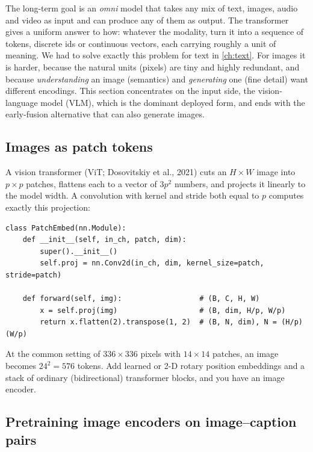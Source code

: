 The long-term goal is an \emph{omni} model that takes any mix of text, images, audio and
video as input and can produce any of them as output. The transformer gives a uniform answer
to how: whatever the modality, turn it into a sequence of tokens, discrete ids or continuous
vectors, each carrying roughly a unit of meaning. We had to solve exactly this problem for text in
\cref{ch:text}. For images it is harder, because the natural units (pixels) are tiny and
highly redundant, and because \emph{understanding} an image (semantics) and \emph{generating}
one (fine detail) want different encodings. This section concentrates on the input side, the
vision-language model (VLM), which is the dominant deployed form, and ends with the early-fusion
alternative that can also generate images.

\subsection{Images as patch tokens}

A vision transformer (ViT; Dosovitskiy et al., 2021) cuts an $H\times W$ image into $p\times p$
patches, flattens each to a vector of $3p^2$ numbers, and projects it linearly to the model width.
A convolution with kernel and stride both equal to $p$ computes exactly this projection:
\begin{lstlisting}[caption={Patch embedding: a strided convolution is a per-patch linear map.},label={lst:align:patch}]
class PatchEmbed(nn.Module):
    def __init__(self, in_ch, patch, dim):
        super().__init__()
        self.proj = nn.Conv2d(in_ch, dim, kernel_size=patch, stride=patch)

    def forward(self, img):                  # (B, C, H, W)
        x = self.proj(img)                   # (B, dim, H/p, W/p)
        return x.flatten(2).transpose(1, 2)  # (B, N, dim), N = (H/p)(W/p)
\end{lstlisting}
At the common setting of $336\times336$ pixels with $14\times14$ patches, an image becomes
$24^2=576$ tokens. Add learned or 2-D rotary position embeddings and a stack of ordinary
(bidirectional) transformer blocks, and you have an image encoder.

\subsection{Pretraining image encoders on image--caption pairs}

